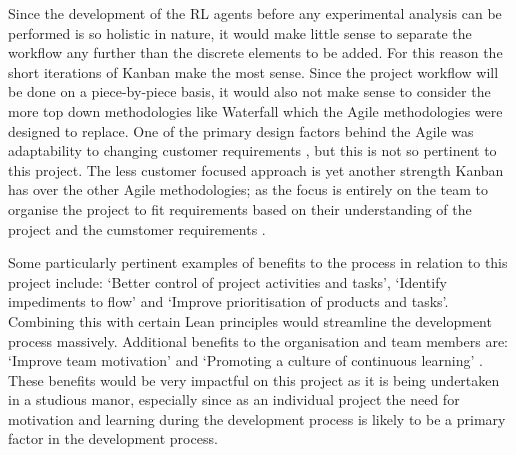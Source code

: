 \documentclass[hidelinks,journal]{IEEEtran}
\begin{document}
Since the development of the RL agents before any experimental analysis can be performed is so holistic in nature, it would make little sense to separate the workflow any further than the discrete elements to be added. For this reason the short iterations of Kanban make the most sense. Since the project workflow will be done on a piece-by-piece basis, it would also not make sense to consider the more top down methodologies like Waterfall which the Agile methodologies were designed to replace. One of the primary design factors behind the Agile was adaptability to changing customer requirements \parencite{Beck01}, but this is not so pertinent to this project. The less customer focused approach is yet another strength Kanban has over the other Agile methodologies; as the focus is entirely on the team to organise the project to fit requirements based on their understanding of the project and the cumstomer requirements \parencite{Ahmad17}.

Some particularly pertinent examples of benefits to the process in relation to this project include: ‘Better control of project activities and tasks’, ‘Identify impediments to flow’ and ‘Improve prioritisation of products and tasks’. Combining this with certain Lean principles would streamline the development process massively. Additional benefits to the organisation and team members are: ‘Improve team motivation’ and ‘Promoting a culture of continuous learning’ \parencite[Table 13,105]{Ahmad17}. These benefits would be very impactful on this project as it is being undertaken in a studious manor, especially since as an individual project the need for motivation and learning during the development process is likely to be a primary factor in the development process.
\end{document}
